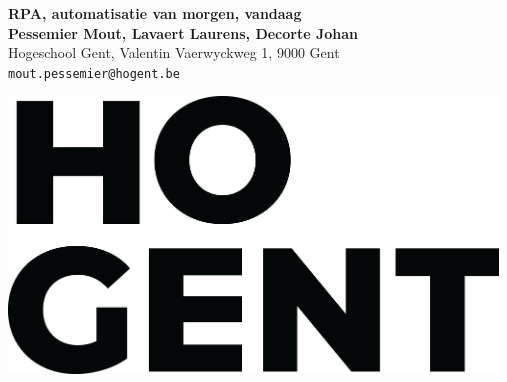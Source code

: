 \documentclass[a0,portrait]{a0poster}
\begin{document}

\begin{minipage}[t]{0.75\linewidth}
\VeryHuge \color{HoGentAccent1} \textbf{RPA, automatisatie van morgen, vandaag} \color{Black}\\
\huge \textbf{Pessemier Mout, Lavaert Laurens, Decorte Johan}\\[0.5cm]
\huge Hogeschool Gent, Valentin Vaerwyckweg 1, 9000 Gent\\[0.4cm]
\Large \texttt{mout.pessemier@hogent.be} \\
\end{minipage}
%
\begin{minipage}[t]{0.25\linewidth}
\includegraphics[width=13cm,right]{figures/HOGENT_Logo_Pos_rgb.png} 

\end{minipage}

\vspace{1cm}

\end{document}
